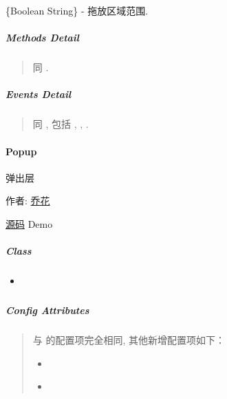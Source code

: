\documentclass[letterpaper,10pt,english]{sphinxmanual}
\begin{document}

\begin{fulllineitems}
\{Boolean \textbar{} String\} - 拖放区域范围.

\end{fulllineitems}



\subparagraph{Methods Detail}
\label{api/component/overlay/dialog:methods-detail}\begin{quote}

同 {\hyperref[api/component/overlay/popup:module-Overlay]{}} .
\end{quote}


\subparagraph{Events Detail}
\label{api/component/overlay/dialog:events-detail}\begin{quote}

同 {\hyperref[api/component/overlay/popup:module-Overlay]{}} , 包括 {\hyperref[api/component/overlay/overlay:Overlay.show]{}} , {\hyperref[api/component/overlay/overlay:Overlay.hide]{}} , {\hyperref[api/component/overlay/overlay:Overlay.beforeVisibleChange]{}} .
\end{quote}
\label{api/component/overlay/popup:module-Overlay}

\paragraph{Popup}
\label{api/component/overlay/popup:popup}\label{api/component/overlay/popup::doc}
\begin{DUlineblock}{0em}
\item[] 弹出层
\item[] 作者: \href{mailto:qiaohua@taobao.com}{乔花}
\item[] \href{https://github.com/kissyteam/kissy/tree/master/src/overlay/}{源码}  \textbar{} Demo
\end{DUlineblock}


\subparagraph{Class}
\label{api/component/overlay/popup:class}\begin{itemize}
\item {}
{\hyperref[api/component/overlay/popup:Overlay.Popup]{}}

\end{itemize}


\subparagraph{Config Attributes}
\label{api/component/overlay/popup:config-attributes}\begin{quote}

与 {\hyperref[api/component/overlay/popup:module-Overlay]{}} 的配置项完全相同, 其他新增配置项如下：
\begin{itemize}
\item {}
{\hyperref[api/component/overlay/popup:Overlay.trigger]{}}

\item {}
{\hyperref[api/component/overlay/popup:Overlay.triggerType]{}}

\end{itemize}
\end{quote}
\end{document}
